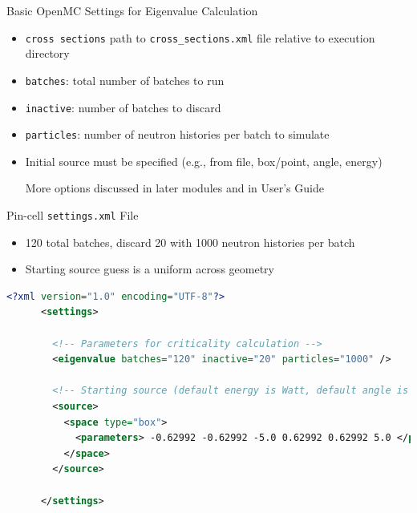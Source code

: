 \documentclass[serif]{beamer}
\begin{document}

\begin{frame}{Basic OpenMC Settings for Eigenvalue Calculation}

  \begin{itemize}

    \item<1-> \texttt{\color{darkblue}cross sections} path 
              to \texttt{cross\_sections.xml} file relative to execution directory\vfill
    \item<1-> \texttt{\color{darkblue}batches}: total number of batches to run\vfill
    \item<1-> \texttt{\color{darkblue}inactive}: number of batches to discard\vfill
    \item<1-> \texttt{\color{darkblue}particles}: number of neutron histories
              per batch to simulate\vfill
    \item<1-> Initial source must be specified (e.g., from file, box/point, angle, energy)\vfill
    \begin{center}
      \alert{More options discussed in later modules and in User's Guide}
    \end{center}

  \end{itemize}

\end{frame}


\begin{frame}[fragile]{Pin-cell \texttt{settings.xml} File}

  \begin{itemize}
    \item 120 total batches, discard 20 with 1000 neutron histories per batch
    \item Starting source guess is a uniform across geometry
  \end{itemize}
  \vfill
  \begin{scriptsize}
    \begin{lstlisting}[language=XML,gobble=4]
      <?xml version="1.0" encoding="UTF-8"?>
      <settings>

        <!-- Parameters for criticality calculation -->
        <eigenvalue batches="120" inactive="20" particles="1000" />

        <!-- Starting source (default energy is Watt, default angle is isotropic) -->
        <source>
          <space type="box">
            <parameters> -0.62992 -0.62992 -5.0 0.62992 0.62992 5.0 </parameters>
          </space>
        </source>

      </settings>
    \end{lstlisting}
  \end{scriptsize}
  \vfill
\end{frame}
\end{document}
